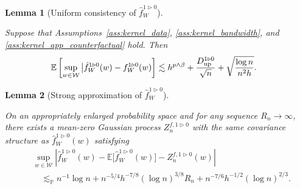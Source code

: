 \documentclass[11pt,lof]{puthesis}
\renewcommand{\P}{\ensuremath{\mathbb{P}}}
\newcommand{\E}{\ensuremath{\mathbb{E}}}
\newcommand{\cW}{\ensuremath{\mathcal{W}}}
\newcommand{\Du}{\ensuremath{D_{\textup{up}}}}
\theoremstyle{break}
\newtheorem{lemma}{Lemma}[section]
\theoremstyle{proof}
\begin{document}
\begin{lemma}[Uniform consistency of $\hat f_W^{1 \triangleright 0}$]
  \label{lem:kernel_app_counterfactual_uniform_consistency}

  Suppose that Assumptions~\ref{ass:kernel_data},
  \ref{ass:kernel_bandwidth}, and \ref{ass:kernel_app_counterfactual} hold.
  Then
  \begin{align*}
    \E\left[
      \sup_{w \in \cW}
      \big|\hat f_W^{1 \triangleright 0}(w)
      - f_W^{1 \triangleright 0}(w)
    \right]
    &\lesssim
    h^{p \wedge \beta}
    + \frac{\Du^{1 \triangleright 0}}{\sqrt n}
    + \sqrt{\frac{\log n}{n^2h}}.
  \end{align*}

\end{lemma}

\begin{lemma}[Strong approximation of $\hat f_W^{1 \triangleright 0}$]
  \label{lem:kernel_app_counterfactual_sa}

  On an appropriately enlarged probability space
  and for any sequence $R_n \to \infty$,
  there exists a mean-zero Gaussian process
  $Z_n^{f, 1 \triangleright 0}$
  with the same covariance structure as
  $\hat f_W^{1 \triangleright 0}(w)$ satisfying
  \begin{align*}
    &\sup_{w \in \cW}
    \left|
      \hat f_W^{1 \triangleright 0}(w)
      - \E\big[\hat f_W^{1 \triangleright 0}(w)\big]
      - Z_n^{f, 1 \triangleright 0}(w)
    \right| \\
    &\quad\lesssim_\P
    n^{-1} \log n
    + n^{-5/4} h^{-7/8} (\log n)^{3/8} R_n
    + n^{-7/6} h^{-1/2} (\log n)^{2/3}.
  \end{align*}

\end{lemma}
\end{document}
